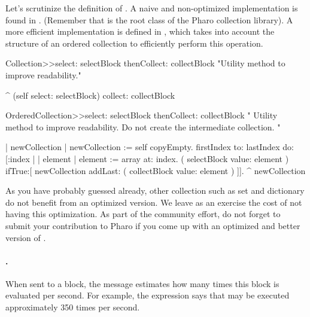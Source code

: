 \documentclass[a4paper,10pt,twoside]{book}
\begin{document}
Let's scrutinize the definition of . A naive and non-optimized implementation is found in . (Remember that  is the root class of the Pharo collection library). A more efficient implementation is defined in , which takes into account the structure of an ordered collection to efficiently perform this operation.

\begin{code}{}
Collection>>select: selectBlock thenCollect: collectBlock
	"Utility method to improve readability."

	^ (self select: selectBlock) collect: collectBlock
\end{code}

\begin{code}{}
OrderedCollection>>select: selectBlock thenCollect: collectBlock
    " Utility method to improve readability.
	Do not create the intermediate collection. "

	| newCollection |
    newCollection := self copyEmpty.
    firstIndex to: lastIndex do:[:index |
		| element |
		element := array at: index.
		( selectBlock value: element ) 
			ifTrue:[ newCollection addLast: ( collectBlock value: element ) ]].
    ^ newCollection
\end{code}

As you have probably guessed already, other collection such as set and dictionary do not benefit from an optimized version. We leave as an exercise the cost of not having this optimization. As part of the community effort, do not forget to submit your contribution to Pharo if you come up with an optimized and better version of .


\paragraph{.} When sent to a block, the  message estimates how many times this block is evaluated per second. For example, the expression  says that  may be executed approximately 350 times per second.
\end{document}
